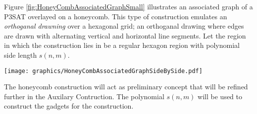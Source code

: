 Figure \ref{fig:HoneyCombAssociatedGraphSmall} illustrates an associated graph of a P3SAT overlayed on a honeycomb.
This type of construction emulates an \textit{orthoganal drawning} over a hexagonal grid; an orthoganal drawing where edges are drawn with alternating vertical and horizontal line segments.
Let the region in which the construction lies in be a regular hexagon region with polynomial side length $s(n,m)$. 


\begin{minipage}{\linewidth}
\begin{center}
\texttt{[image: graphics/HoneyCombAssociatedGraphSideBySide.pdf]}
\label{fig:HoneyCombAssociatedGraphSmall}
\end{center}
\end{minipage}

The honeycomb construction will act as preliminary concept that will be refined further in the Auxilary Contruction.
The polynomial $s(n,m)$ will be used to construct the gadgets for the construction.
